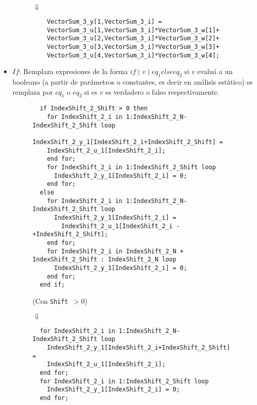 \begin{itemize}
\begin{figure}[htp]
$\Downarrow$

\begin{verbatim}
    VectorSum_3_y[1,VectorSum_3_i] = 
	VectorSum_3_u[1,VectorSum_3_i]*VectorSum_3_w[1]+
	VectorSum_3_u[2,VectorSum_3_i]*VectorSum_3_w[2]+
	VectorSum_3_u[3,VectorSum_3_i]*VectorSum_3_w[3]+
	VectorSum_3_u[4,VectorSum_3_i]*VectorSum_3_w[4];
\end{verbatim}
\end{figure}

		\item $If$: Remplaza expresiones de la forma $if(v){eq_1}else{eq_2}$ si $v$ evaluá a un booleano (a partir de parámetros o constantes, 
			es decir en análisis estático) se remplaza por $eq_1$ o $eq_2$ si es $v$ es verdadero o falso respectivamente.

\begin{figure}[htp]
\centering
\begin{verbatim}
  if IndexShift_2_Shift > 0 then
    for IndexShift_2_i in 1:IndexShift_2_N-IndexShift_2_Shift loop
      IndexShift_2_y_1[IndexShift_2_i+IndexShift_2_Shift] = 
	IndexShift_2_u_1[IndexShift_2_i];
    end for;
    for IndexShift_2_i in 1:IndexShift_2_Shift loop
      IndexShift_2_y_1[IndexShift_2_i] = 0;
    end for;
  else
    for IndexShift_2_i in 1:IndexShift_2_N-IndexShift_2_Shift loop
      IndexShift_2_y_1[IndexShift_2_i] = 
		IndexShift_2_u_1[IndexShift_2_i - +IndexShift_2_Shift];
    end for;
    for IndexShift_2_i in IndexShift_2_N + IndexShift_2_Shift : IndexShift_2_N loop
      IndexShift_2_y_1[IndexShift_2_i] = 0;
    end for;
  end if;
\end{verbatim}

(Con \texttt{Shift $> 0$})

$\Downarrow$

\begin{verbatim}
  for IndexShift_2_i in 1:IndexShift_2_N-IndexShift_2_Shift loop
    IndexShift_2_y_1[IndexShift_2_i+IndexShift_2_Shift] = 
	IndexShift_2_u_1[IndexShift_2_i];
  end for;
  for IndexShift_2_i in 1:IndexShift_2_Shift loop
    IndexShift_2_y_1[IndexShift_2_i] = 0;
  end for;
\end{verbatim}
\end{figure}
	  \end{itemize}
